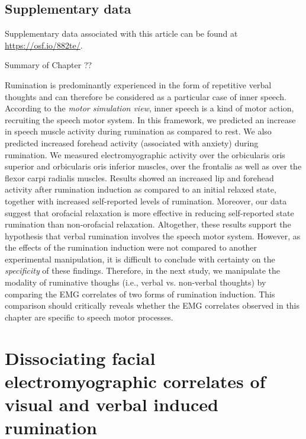 \documentclass[a4paper,12pt,twoside,onecolumn,openright,final,oldfontcommands]{memoir}
\newcommand\getcurrentref[1]{
 \ifnumequal{\value{#1}}{0}
  {??}
  {\the\value{#1}}
}
\begin{document}
\hypertarget{suppCH3}{%
\section{Supplementary data}\label{suppCH3}}

Supplementary data associated with this article can be found at \url{https://osf.io/882te/}.

\newpage

\begin{vplace}[1]

\begin{summary}{Summary of Chapter\getcurrentref{chapter}}

Rumination is predominantly experienced in the form of repetitive verbal thoughts and can therefore be considered as a particular case of inner speech. According to the \textit{motor simulation view}, inner speech is a kind of motor action, recruiting the speech motor system. In this framework, we predicted an increase in speech muscle activity during rumination as compared to rest. We also predicted increased forehead activity (associated with anxiety) during rumination. We measured electromyographic activity over the orbicularis oris superior and orbicularis oris inferior muscles, over the frontalis as well as over the flexor carpi radialis muscles. Results showed an increased lip and forehead activity after rumination induction as compared to an initial relaxed state, together with increased self-reported levels of rumination. Moreover, our data suggest that orofacial relaxation is more effective in reducing self-reported state rumination than non-orofacial relaxation. Altogether, these results support the hypothesis that verbal rumination involves the speech motor system. However, as the effects of the rumination induction were not compared to another experimental manipulation, it is difficult to conclude with certainty on the \textit{specificity} of these findings. Therefore, in the next study, we manipulate the modality of ruminative thoughs (i.e., verbal vs. non-verbal thoughts) by comparing the EMG correlates of two forms of rumination induction. This comparison should critically reveals whether the EMG correlates observed in this chapter are specific to speech motor processes.

\end{summary}

\end{vplace}

\hypertarget{chap4}{%
\chapter{Dissociating facial electromyographic correlates of visual and verbal induced rumination}\label{chap4}}
\end{document}
